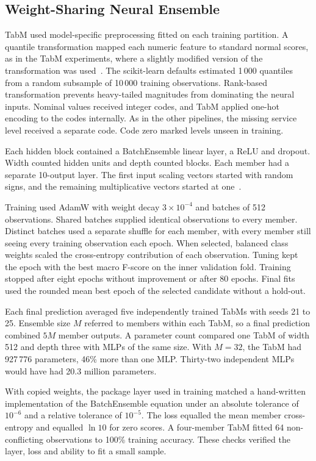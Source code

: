 \documentclass[conference]{IEEEtran}
\begin{document}
\subsection{Weight-Sharing Neural Ensemble}
TabM used model-specific preprocessing fitted on each training partition. A quantile transformation mapped each numeric feature to standard normal scores, as in the TabM experiments, where a slightly modified version of the transformation was used~\cite{gorishniy2025}. The scikit-learn defaults estimated 1\,000 quantiles from a random subsample of 10\,000 training observations. Rank-based transformation prevents heavy-tailed magnitudes from dominating the neural inputs. Nominal values received integer codes, and TabM applied one-hot encoding to the codes internally. As in the other pipelines, the missing service level received a separate code. Code zero marked levels unseen in training.

Each hidden block contained a BatchEnsemble linear layer, a ReLU and dropout. Width counted hidden units and depth counted blocks. Each member had a separate 10-output layer. The first input scaling vectors started with random signs, and the remaining multiplicative vectors started at one~\cite{gorishniy2025}.

Training used AdamW with weight decay $3\times10^{-4}$ and batches of 512 observations. Shared batches supplied identical observations to every member. Distinct batches used a separate shuffle for each member, with every member still seeing every training observation each epoch. When selected, balanced class weights scaled the cross-entropy contribution of each observation. Tuning kept the epoch with the best macro F-score on the inner validation fold. Training stopped after eight epochs without improvement or after 80 epochs. Final fits used the rounded mean best epoch of the selected candidate without a hold-out.

Each final prediction averaged five independently trained TabMs with seeds 21 to 25. Ensemble size $M$ referred to members within each TabM, so a final prediction combined $5M$ member outputs. A parameter count compared one TabM of width 512 and depth three with MLPs of the same size. With $M=32$, the TabM had 927\,776 parameters, 46\% more than one MLP. Thirty-two independent MLPs would have had 20.3 million parameters.

With copied weights, the package layer used in training matched a hand-written implementation of the BatchEnsemble equation under an absolute tolerance of $10^{-6}$ and a relative tolerance of $10^{-5}$. The loss equalled the mean member cross-entropy and equalled $\ln 10$ for zero scores. A four-member TabM fitted 64 non-conflicting observations to 100\% training accuracy. These checks verified the layer, loss and ability to fit a small sample.
\end{document}
